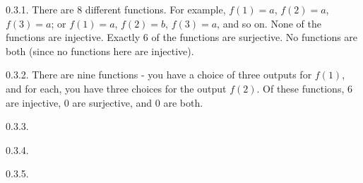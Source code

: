  \protect {} \protect \begin {itemize} 
\begin{ans}{0.3.1.}
	There are 8 different functions.  For example, $f(1) = a$, $f(2) = a$, $f(3) = a$; or $f(1) = a$, $f(2) = b$, $f(3) = a$, and so on.  None of the functions are injective.  Exactly 6 of the functions are surjective.  No functions are both (since no functions here are injective).
	
\end{ans}
\begin{ans}{0.3.2.}
	There are nine functions - you have a choice of three outputs for $f(1)$, and for each, you have three choices for the output $f(2)$.  Of these functions, 6 are injective, 0 are surjective, and 0 are both.
	
\end{ans}
\begin{ans}{0.3.3.}
	
\end{ans}
\begin{ans}{0.3.4.}
	
\end{ans}
\begin{ans}{0.3.5.}
		\begin{parts}

\end{parts}
\end{ans}
\end{itemize}
